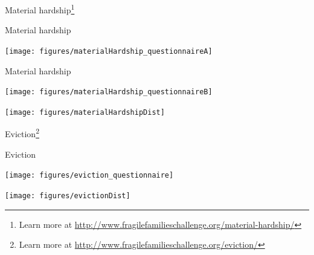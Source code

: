 \documentclass[aspectratio=169]{beamer}
\begin{document}
\begin{frame}

\Large{
\begin{center}
Material hardship\footnote{Learn more at \url{http://www.fragilefamilieschallenge.org/material-hardship/}} 
\end{center}
}

\end{frame}
\begin{frame}{Material hardship}

\centering
\texttt{[image: figures/materialHardship\_questionnaireA]}

\end{frame}
\begin{frame}{Material hardship}

\centering
\texttt{[image: figures/materialHardship\_questionnaireB]}

\end{frame}
\begin{frame}

\centering
\texttt{[image: figures/materialHardshipDist]}

\end{frame}
\begin{frame}

\Large{
\begin{center}
Eviction\footnote{Learn more at \url{http://www.fragilefamilieschallenge.org/eviction/}}
\end{center}
}

\end{frame}
\begin{frame}{Eviction}

\centering
\texttt{[image: figures/eviction\_questionnaire]}

\end{frame}
\begin{frame}

\centering
\texttt{[image: figures/evictionDist]}

\end{frame}
\end{document}
